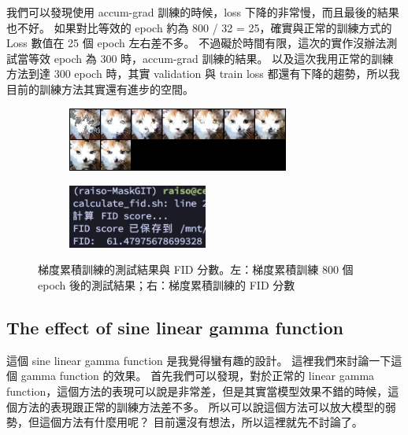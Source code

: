 我們可以發現使用 accum-grad 訓練的時候，loss 下降的非常慢，而且最後的結果也不好。 如果對比等效的 epoch 約為 800 / 32 = 25，確實與正常的訓練方式的 Loss 數值在 25 個 epoch 左右差不多。  不過礙於時間有限，這次的實作沒辦法測試當等效 epoch 為 300 時，accum-grad 訓練的結果。 以及這次我用正常的訓練方法到達 300 epoch 時，其實 validation 與 train loss 都還有下降的趨勢，所以我目前的訓練方法其實還有進步的空間。


\begin{figure}[h]
    \centering
    \begin{subfigure}{0.48\textwidth}
        \centering
        \includegraphics[width=\textwidth, height=2.1cm, keepaspectratio]{figures/ag-epoch800-test_69.png}
        \label{fig:ag-epoch800-test_69}
    \end{subfigure}
    \hfill
    \begin{subfigure}{0.48\textwidth}
        \centering
        \includegraphics[width=\textwidth, height=2.1cm, keepaspectratio]{figures/ag-fid-score.png}
        \label{fig:ag-fid-score}
    \end{subfigure}
    \caption{梯度累積訓練的測試結果與 FID 分數。左：梯度累積訓練 800 個 epoch 後的測試結果；右：梯度累積訓練的 FID 分數}
    \label{fig:ag-epoch800-test}
\end{figure}




\subsection{The effect of sine linear gamma function}
這個 sine linear gamma function 是我覺得蠻有趣的設計。 這裡我們來討論一下這個 gamma function 的效果。
首先我們可以發現，對於正常的 linear gamma function，這個方法的表現可以說是非常差，但是其實當模型效果不錯的時候，這個方法的表現跟正常的訓練方法差不多。 所以可以說這個方法可以放大模型的弱勢，但這個方法有什麼用呢？ 目前還沒有想法，所以這裡就先不討論了。



